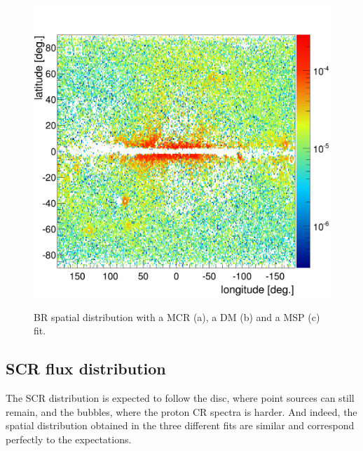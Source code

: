 \begin{figure}[h]
\begin{minipage}[h]{0.45\textwidth}
	  \label{}
  \end{minipage}
  \hfill
  \begin{minipage}[h]{0.45\textwidth}
	  \centering
	  \includegraphics[width=1.\linewidth]{pic/discussion/MSPonly_fine_BR_integral_distribution.png}
	  \label{}
  \end{minipage}
  \caption[BR spatial distributions.]{BR spatial distribution with a MCR (a), a DM (b) and a MSP (c) fit.}
  \label{fig:BR_flux_distrib_excess_comp}	 
\end{figure}
\newpage
\subsection{SCR flux distribution}
The SCR distribution is expected to follow the disc, where point sources can still remain, and the bubbles, where the proton CR spectra is harder. And indeed, the spatial distribution obtained in the three  different fits are similar and correspond perfectly to the expectations.


